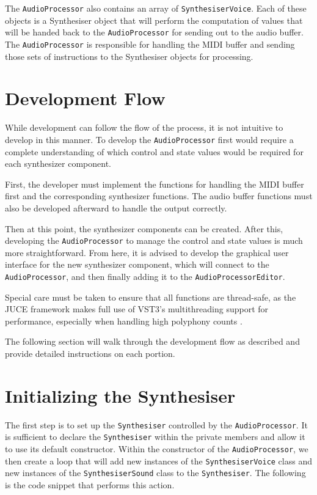 \documentclass[a4paper,12pt]{report}
\begin{document}
The \texttt{Audio\-Processor} also contains an array of \texttt{Synthesiser\-Voice}. Each of these objects is a Synthesiser object that will perform the computation of values that will be handed back to the \texttt{Audio\-Processor}  for sending out to the audio buffer. The \texttt{Audio\-Processor} is responsible for handling the MIDI buffer and sending those sets of instructions to the Synthesiser objects for processing.

\section{Development Flow}
\label{sec:devflow}
While development can follow the flow of the process, it is not intuitive to develop in this manner. To develop the \texttt{Audio\-Processor} first would require a complete understanding of which control and state values would be required for each synthesizer component.

First, the developer must implement the functions for handling the MIDI buffer first and the corresponding synthesizer functions. The audio buffer functions must also be developed afterward to handle the output correctly.

Then at this point, the synthesizer components can be created. After this, developing the \texttt{Audio\-Processor} to manage the control and state values is much more straightforward. From here, it is advised to develop the graphical user interface for the new synthesizer component, which will connect to the \texttt{Audio\-Processor}, and then finally adding it to the \texttt{Audio\-Processor\-Editor}.

Special care must be taken to ensure that all functions are thread-safe, as the JUCE framework makes full use of VST3's multithreading support for performance, especially when handling high polyphony counts \cite{juceclassindex}.

The following section will walk through the development flow as described and provide detailed instructions on each portion.

\section{Initializing the Synthesiser}
\label{sec:initializesynthesizer}
The first step is to set up the \texttt{Synthesiser} controlled by the \texttt{Audio\-Processor}. It is sufficient to declare the \texttt{Synthesiser} within the private members and allow it to use its default constructor. 
Within the constructor of the \texttt{Audio\-Processor}, we then create a loop that will add new instances of the \texttt{Synthesiser\-Voice} class and new instances of the \texttt{Synthesiser\-Sound} class to the \texttt{Synthesiser}. The following is the code snippet that performs this action.
\end{document}
